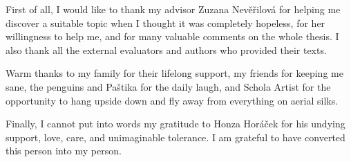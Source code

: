 First of all, I would like to thank my advisor Zuzana Nevěřilová for helping me discover a suitable topic when I thought it was completely hopeless, for her willingness to help me, and for many valuable comments on the whole thesis. I also thank all the external evaluators and authors who provided their texts.

Warm thanks to my family for their lifelong support, my friends for keeping me sane, the penguins and Paštika for the daily laugh, and Schola Artist for the opportunity to hang upside down and fly away from everything on aerial silks.

Finally, I cannot put into words my gratitude to Honza Horáček for his undying support, love, care, and unimaginable tolerance. I am grateful to have converted this person into my person.
